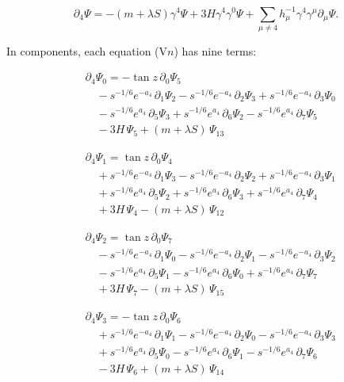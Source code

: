 \documentclass[11pt]{article}
\begin{document}
\[
\partial_4\Psi=-(m+\lambda S)\gamma^4\Psi+3H\gamma^4\gamma^0\Psi+\sum_{\mu\ne4}h_\mu^{-1}\gamma^4\gamma^\mu\partial_\mu\Psi .
\]

In components, each equation (V$n$) has nine terms:

\[
\begin{aligned}
&\partial_{4}\Psi_{0}=-\tan z\,\partial_{0}\Psi_{5} \\
&\quad -s^{-1/6}e^{-a_4}\,\partial_{1}\Psi_{2}-s^{-1/6}e^{-a_4}\,\partial_{2}\Psi_{3}+s^{-1/6}e^{-a_4}\,\partial_{3}\Psi_{0} \\
&\quad -s^{-1/6}e^{a_4}\,\partial_{5}\Psi_{3}+s^{-1/6}e^{a_4}\,\partial_{6}\Psi_{2}-s^{-1/6}e^{a_4}\,\partial_{7}\Psi_{5} \\
&\quad -3H\,\Psi_{5}+(m+\lambda S)\,\Psi_{13}
\end{aligned}\tag{V0}
\]

\[
\begin{aligned}
&\partial_{4}\Psi_{1}=\tan z\,\partial_{0}\Psi_{4} \\
&\quad +s^{-1/6}e^{-a_4}\,\partial_{1}\Psi_{3}-s^{-1/6}e^{-a_4}\,\partial_{2}\Psi_{2}+s^{-1/6}e^{-a_4}\,\partial_{3}\Psi_{1} \\
&\quad +s^{-1/6}e^{a_4}\,\partial_{5}\Psi_{2}+s^{-1/6}e^{a_4}\,\partial_{6}\Psi_{3}+s^{-1/6}e^{a_4}\,\partial_{7}\Psi_{4} \\
&\quad +3H\,\Psi_{4}-(m+\lambda S)\,\Psi_{12}
\end{aligned}\tag{V1}
\]

\[
\begin{aligned}
&\partial_{4}\Psi_{2}=\tan z\,\partial_{0}\Psi_{7} \\
&\quad -s^{-1/6}e^{-a_4}\,\partial_{1}\Psi_{0}-s^{-1/6}e^{-a_4}\,\partial_{2}\Psi_{1}-s^{-1/6}e^{-a_4}\,\partial_{3}\Psi_{2} \\
&\quad -s^{-1/6}e^{a_4}\,\partial_{5}\Psi_{1}-s^{-1/6}e^{a_4}\,\partial_{6}\Psi_{0}+s^{-1/6}e^{a_4}\,\partial_{7}\Psi_{7} \\
&\quad +3H\,\Psi_{7}-(m+\lambda S)\,\Psi_{15}
\end{aligned}\tag{V2}
\]

\[
\begin{aligned}
&\partial_{4}\Psi_{3}=-\tan z\,\partial_{0}\Psi_{6} \\
&\quad +s^{-1/6}e^{-a_4}\,\partial_{1}\Psi_{1}-s^{-1/6}e^{-a_4}\,\partial_{2}\Psi_{0}-s^{-1/6}e^{-a_4}\,\partial_{3}\Psi_{3} \\
&\quad +s^{-1/6}e^{a_4}\,\partial_{5}\Psi_{0}-s^{-1/6}e^{a_4}\,\partial_{6}\Psi_{1}-s^{-1/6}e^{a_4}\,\partial_{7}\Psi_{6} \\
&\quad -3H\,\Psi_{6}+(m+\lambda S)\,\Psi_{14}
\end{aligned}\tag{V3}
\]
\end{document}
